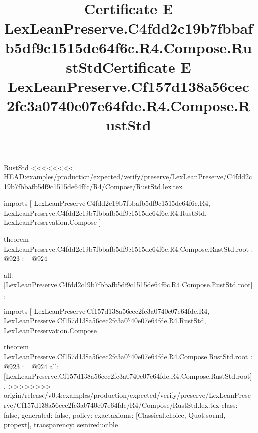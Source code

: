 \begin{lexlean}{RustStd}
<<<<<<<< HEAD:examples/production/expected/verify/preserve/LexLeanPreserve/C4fdd2c19b7fbbafb5df9c1515de64f6c/R4/Compose/RustStd.lex.tex
\title{Certificate E LexLeanPreserve.C4fdd2c19b7fbbafb5df9c1515de64f6c.R4.Compose.RustStd}
\begin{coremodule}
imports [
  LexLeanPreserve.C4fdd2c19b7fbbafb5df9c1515de64f6c.R4,
  LexLeanPreserve.C4fdd2c19b7fbbafb5df9c1515de64f6c.R4.RustStd,
  LexLeanPreservation.Compose
]

theorem LexLeanPreserve.C4fdd2c19b7fbbafb5df9c1515de64f6c.R4.Compose.RustStd.root : @923 := @924 {
  all: [LexLeanPreserve.C4fdd2c19b7fbbafb5df9c1515de64f6c.R4.Compose.RustStd.root],
========
\title{Certificate E LexLeanPreserve.Cf157d138a56cec2fc3a0740e07e64fde.R4.Compose.RustStd}
\begin{coremodule}
imports [
  LexLeanPreserve.Cf157d138a56cec2fc3a0740e07e64fde.R4,
  LexLeanPreserve.Cf157d138a56cec2fc3a0740e07e64fde.R4.RustStd,
  LexLeanPreservation.Compose
]

theorem LexLeanPreserve.Cf157d138a56cec2fc3a0740e07e64fde.R4.Compose.RustStd.root : @923 := @924 {
  all: [LexLeanPreserve.Cf157d138a56cec2fc3a0740e07e64fde.R4.Compose.RustStd.root],
>>>>>>>> origin/release/v0.4:examples/production/expected/verify/preserve/LexLeanPreserve/Cf157d138a56cec2fc3a0740e07e64fde/R4/Compose/RustStd.lex.tex
  class: false,
  generated: false,
  policy: exact{axioms: [Classical.choice, Quot.sound, propext]},
  transparency: semireducible
}


\end{coremodule}}
\end{coremodule}
\end{lexlean}

